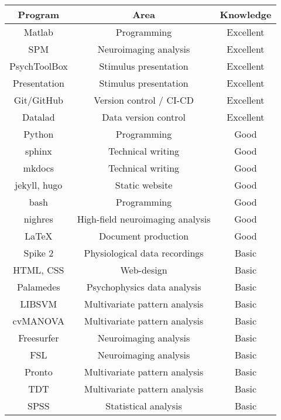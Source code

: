 
\begin{center}
\begin{tabular}[c]{|c|c|c|}
\hline\hline
Program         & Area                              & Knowledge \\
\hline
Matlab          & Programming                       & Excellent \\
SPM             & Neuroimaging analysis             & Excellent \\
PsychToolBox    & Stimulus presentation             & Excellent \\
Presentation    & Stimulus presentation             & Excellent \\
Git/GitHub      & Version control / CI-CD           & Excellent \\
Datalad         & Data version control              & Excellent \\
Python          & Programming                       & Good \\
sphinx          & Technical writing                 & Good \\
mkdocs          & Technical writing                 & Good \\
jekyll, hugo    & Static website                    & Good \\
bash            & Programming                       & Good \\
nighres         & High-field neuroimaging analysis  & Good \\
\LaTeX          & Document production               & Good \\
Spike 2         & Physiological data recordings     & Basic \\
HTML, CSS       & Web-design                        & Basic \\
Palamedes       & Psychophysics data analysis       & Basic \\
LIBSVM          & Multivariate pattern analysis     & Basic \\
cvMANOVA        & Multivariate pattern analysis     & Basic \\
Freesurfer      & Neuroimaging analysis             & Basic \\
FSL             & Neuroimaging analysis             & Basic \\
Pronto          & Multivariate pattern analysis     & Basic \\
TDT             & Multivariate pattern analysis     & Basic \\
SPSS            & Statistical analysis              & Basic \\
\hline\hline
\end{tabular}
\end{center}

